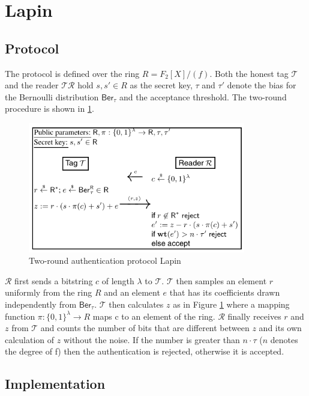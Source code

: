 \documentclass[11pt,a4paper]{article}
\begin{document}
\section{Lapin}

\subsection{Protocol}

The protocol is defined over the ring $R = F_2[X] / (f)$. Both the honest tag $\mathcal{T}$ and the reader $\mathcal{TR}$ hold $s, s' \in R$ as the secret key, $\tau$ and $\tau'$ denote the bias for the Bernoulli distribution $\mathsf{Ber}_\tau$ and the acceptance threshold. The two-round procedure is shown in \ref{fig4}.

\begin{figure}[h]
	\includegraphics[width=9.5cm]{lapin}
	\centering
	\caption{Two-round authentication protocol Lapin}
	\label{fig4}
\end{figure}

$\mathcal{R}$ first sends a bitstring $c$ of length $\lambda$ to $\mathcal{T}$. $\mathcal{T}$ then samples an element $r$ uniformly from the ring $R$ and an element $e$ that has its coefficients drawn independently from $\mathsf{Ber}_\tau$. 
$\mathcal{T}$ then calculates $z$ as in Figure \ref{fig4} where a mapping function $\pi: \{0,1\}^\lambda \rightarrow R$ maps c to an element of the ring. 
$\mathcal{R}$ finally receives $r$ and $z$ from $\mathcal{T}$ and counts the number of bits that are different between $z$ and its own calculation of $z$ without the noise. 
If the number is greater than $n \cdot \tau$ ($n$ denotes the degree of f) then the authentication is rejected, otherwise it is accepted.


\subsection{Implementation}
\end{document}
